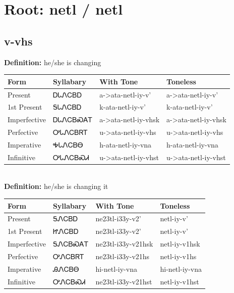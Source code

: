 \documentclass{article}%
\begin{document}
%
\normalsize%
\section*{Root: netl / netl}%
\subsection*{v-vhs}%
\textbf{Definition: }%
he/she is changing%
\\[0.5em]%
\begin{tabular}{|l|l|l|l|}%
\hline%
\textbf{Form}&\textbf{Syllabary}&\textbf{With Tone}&\textbf{Toneless}\\%
\hline%
Present&ᎠᏓᏁᏟᏴᎠ&a{-}>ata{-}netl{-}iy{-}v'&a{-}>ata{-}netl{-}iy{-}v'\\%
1st Present&ᎦᏓᏁᏟᏴᎠ&k{-}ata{-}netl{-}iy{-}v'&k{-}ata{-}netl{-}iy{-}v'\\%
Imperfective&ᎠᏓᏁᏟᏴᏍᎪᎢ&a{-}>ata{-}netl{-}iy{-}vhsk&a{-}>ata{-}netl{-}iy{-}vhsk\\%
Perfective&ᎤᏓᏁᏟᏴᏒᎢ&u{-}>ata{-}netl{-}iy{-}vhs&u{-}>ata{-}netl{-}iy{-}vhs\\%
Imperative&ᎭᏓᏁᏟᏴᎾ&h{-}ata{-}netl{-}iy{-}vna&h{-}ata{-}netl{-}iy{-}vna\\%
Infinitive&ᎤᏓᏁᏟᏴᏍᏗ&u{-}>ata{-}netl{-}iy{-}vhst&u{-}>ata{-}netl{-}iy{-}vhst\\%
\hline%
\end{tabular}%
\\[1em]%
\textbf{Definition: }%
he/she is changing it%
\\[0.5em]%
\begin{tabular}{|l|l|l|l|}%
\hline%
\textbf{Form}&\textbf{Syllabary}&\textbf{With Tone}&\textbf{Toneless}\\%
\hline%
Present&ᎦᏁᏟᏴᎠ&ne23tl{-}i33y{-}v2'&netl{-}iy{-}v'\\%
1st Present&ᏥᏁᏟᏴᎠ&ne23tl{-}i33y{-}v2'&netl{-}iy{-}v'\\%
Imperfective&ᎦᏁᏟᏴᏍᎪᎢ&ne23tl{-}i33y{-}v21hsk&netl{-}iy{-}v1hsk\\%
Perfective&ᎤᏁᏟᏴᏒᎢ&ne23tl{-}i33y{-}v21hs&netl{-}iy{-}v1hs\\%
Imperative&ᎯᏁᏟᏴᎾ&hi{-}netl{-}iy{-}vna&hi{-}netl{-}iy{-}vna\\%
Infinitive&ᎤᏁᏟᏴᏍᏗ&ne23tl{-}i33y{-}v21hst&netl{-}iy{-}v1hst\\%
\hline%
\end{tabular}%
\\[1em]%
\end{document}
